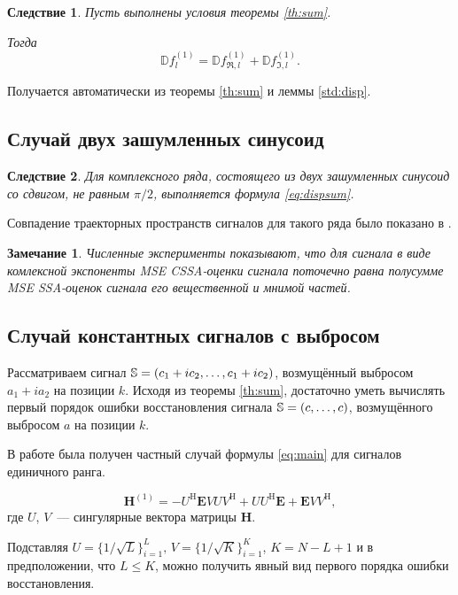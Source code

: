 \documentclass{spisok-article}
\newtheorem{corollary}{Следствие}%
\newtheorem{remark}{Замечание}%
\begin{document}
\begin{corollary} \label{st:dispsum}
	Пусть выполнены условия теоремы \ref{th:sum}.
	
	Тогда
	\begin{equation} \label{eq:dispsum}
		\mathbb{D}f^{(1)}_l = \mathbb{D}f^{(1)}_{\Re, l} + \mathbb{D}f^{(1)}_{\Im, l}.	
	\end{equation}
\end{corollary}

Получается автоматически из теоремы \ref{th:sum} и леммы \ref{std:disp}.

\subsection{Случай двух зашумленных синусоид}
\begin{corollary}
Для комплексного ряда, состоящего из двух зашумленных синусоид со сдвигом, не равным $\pi/2$, выполняется формула \eqref{eq:dispsum}.
\end{corollary}
Совпадение траекторных пространств сигналов для такого ряда было показано в \cite{Golyandina.Stepanov2005}.

\begin{remark}
Численные эксперименты показывают, что для сигнала в виде комлексной экспоненты MSE CSSA-оценки сигнала поточечно равна полусумме MSE SSA-оценок сигнала его вещественной и мнимой частей.
\end{remark}

\subsection{Случай константных сигналов с выбросом}
Рассматриваем сигнал $\mathbb{S} = (c_1 + ic_2, \ldots, c_1 + ic_2)$, возмущённый выбросом $a_1 + ia_2$ на позиции $k$. Исходя из теоремы \ref{th:sum}, достаточно уметь вычислять первый порядок ошибки восстановления сигнала $\mathbb{S} = (c, \ldots, c)$, возмущённого выбросом $a$ на позиции $k$.

В работе \cite{Nekrutkin} была получен частный случай формулы \eqref{eq:main} для сигналов единичного ранга.

$$\mathbf{H}^{(1)} = -U^{\mathrm{H}} \mathbf{E} V U V^{\mathrm{H}} + U U^{\mathrm{H}} \mathbf{E} + \mathbf{E} V V^{\mathrm{H}},$$
где $U$, $V$~--- сингулярные вектора матрицы $\mathbf{H}$.

Подставляя $U = \{1/\sqrt{L}\}^{L}_{i = 1},\, V = \{1/\sqrt{K}\}^{K}_{i = 1}$, $K = N - L + 1$ и в предположении, что $L \leq K$, можно получить явный вид первого порядка ошибки восстановления.
\end{document}
